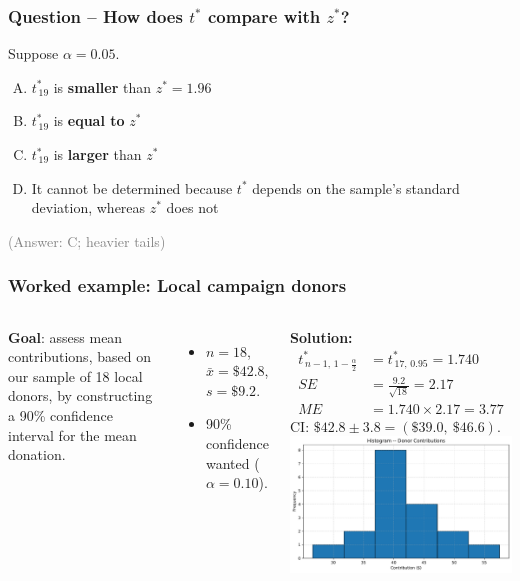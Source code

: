 \documentclass[handout]{beamer}
\begin{document}
\begin{frame}
\frametitle{Question – How does \(t^{\ast}\) compare with \(z^{\ast}\)?}
Suppose \(\alpha=0.05\).
\begin{enumerate}[A.]
  \item \(t^{\ast}_{\,19}\) is \textbf{smaller} than \(z^{\ast}=1.96\)  
  \item \(t^{\ast}_{\,19}\) is \textbf{equal to} \(z^{\ast}\)  
  \item \(t^{\ast}_{\,19}\) is \textbf{larger} than \(z^{\ast}\)  
  \item It cannot be determined because \(t^{\ast}\) depends on the sample’s standard deviation, whereas \(z^{\ast}\) does not  
\end{enumerate}
\pause
\textcolor{gray}{(Answer: C; heavier tails)}  
\end{frame}

\begin{frame}
\frametitle{Worked example: Local campaign donors}
\vspace{-0.5em}
\begin{columns}[T]
\footnotesize
{}
\textbf{Goal}: assess mean contributions, based on our sample of 18 local donors, by constructing a 90\% confidence interval for the mean donation.
\begin{itemize}
  \item \(n=18\), \(\bar x=\$42.8\), \(s=\$9.2\).  
  \item 90\% confidence wanted (\(\alpha=0.10\)).  
\end{itemize}
\pause
\textbf{Solution:}
\begin{align*}
t^{\ast}_{\,n-1,\,1-\frac{\alpha}{2}} &= t^{\ast}_{\,17,\,0.95}  = 1.740 \\
SE &= \frac{9.2}{\sqrt{18}} = 2.17 \\
ME &= 1.740\times2.17 = 3.77
\end{align*}
CI:\; \(\$42.8 \pm 3.8 = (\$39.0,\ \$46.6)\).
\vspace{3em}
\includegraphics[width=\textwidth]{Figures/donor_hist.pdf}
\end{columns}
\end{frame}
\end{document}
